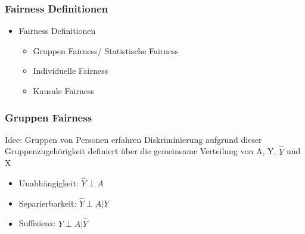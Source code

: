 \documentclass[aspectratio=169]{beamer}
\begin{document}
\begin{frame}
    \frametitle{Fairness Definitionen}
    \begin{itemize}
        \item Fairness Definitionen
        \begin{itemize}
            \item Gruppen Fairness/ Statistische Fairness
            \item Individuelle Fairness
            \item Kausale Fairness
        \end{itemize}
    \end{itemize}
    
\end{frame}


\begin{frame}
	\frametitle{Gruppen Fairness}
	Idee: Gruppen von Personen erfahren Diskriminierung aufgrund dieser Gruppenzugehörigkeit
	definiert über die gemeinsame Verteilung von A, Y, $\hat{Y}$ und X
	\begin{itemize}
		\item Unabhängigkeit: $\hat{Y} \perp A$
		\item Separierbarkeit: $\hat{Y} \perp A | Y$ 
		\item Suffizienz: $Y \perp A | \hat{Y}$
	\end{itemize}
\end{frame}
\end{document}
